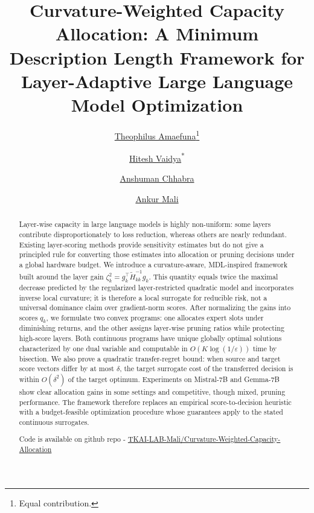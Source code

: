 \documentclass[accepted]{uai2026}%
\title{Curvature-Weighted Capacity Allocation: A Minimum Description Length Framework for Layer-Adaptive Large Language Model Optimization}
\author[1]{\href{mailto:ikennaamaefuna@usf.edu}{Theophilus Amaefuna}\thanks{Equal contribution.}}
\author[1]{\href{mailto:hvaidya@usf.edu}{Hitesh Vaidya}\textsuperscript{*}}
\author[1]{\href{mailto:anshumanc@usf.edu}{Anshuman Chhabra}}%
\author[1]{\href{mailto:ankurarjunmali@usf.edu}{Ankur Mali}}%
\affil[1]{%
  Bellini College of Artificial Intelligence, Cybersecurity and Computing\par
  University of South Florida, Tampa, Florida, USA
}
\theoremstyle{remark}%
\begin{document}
\maketitle

\begin{abstract}
\vspace{-0.5cm}
Layer-wise capacity in large language models is highly non-uniform:
some layers contribute disproportionately to loss reduction, whereas
others are nearly redundant. Existing layer-scoring methods provide
sensitivity estimates but do not give a principled rule for converting
those estimates into allocation or pruning decisions under a global
hardware budget. We introduce a curvature-aware, MDL-inspired framework
built around the layer gain
$\zeta_k^2=g_k^\top\widetilde H_{kk}^{-1}g_k$.
This quantity equals twice the maximal decrease predicted by the
regularized layer-restricted quadratic model and incorporates inverse
local curvature; it is therefore a local surrogate for reducible risk,
not a universal dominance claim over gradient-norm scores.
After normalizing the gains into scores $q_k$, we formulate two convex
programs: one allocates expert slots under diminishing
returns, and the other assigns layer-wise pruning ratios while protecting
high-score layers. Both continuous programs have unique globally optimal
solutions characterized by one dual variable and computable in
$O(K\log(1/\varepsilon))$ time by bisection. We also prove a quadratic
transfer-regret bound: when source and target score vectors differ by at
most $\delta$, the target surrogate cost of the transferred decision is
within $O(\delta^2)$ of the target optimum. Experiments on Mistral-7B and
Gemma-7B show clear allocation gains in some settings and competitive,
though mixed, pruning performance. The framework therefore replaces an
empirical score-to-decision heuristic with a budget-feasible optimization
procedure whose guarantees apply to the stated continuous surrogates.

\noindent Code is available on github repo - \href{https://github.com/TKAI-LAB-Mali/Curvature-Weighted-Capacity-Allocation.git}{TKAI-LAB-Mali/Curvature-Weighted-Capacity-Allocation}
\end{abstract}
\end{document}
